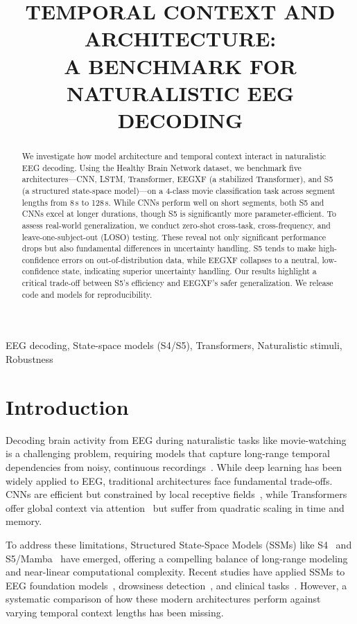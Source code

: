 \documentclass{article}
\title{TEMPORAL CONTEXT AND ARCHITECTURE:\\A BENCHMARK FOR NATURALISTIC EEG DECODING}
\newcommand{\eegtrans}{EEGXF}
\begin{document}
\maketitle

\begin{abstract}
We investigate how model architecture and temporal context interact in naturalistic EEG decoding. Using the Healthy Brain Network dataset, we benchmark five architectures—CNN, LSTM, Transformer, \eegtrans{} (a stabilized Transformer), and S5 (a structured state-space model)—on a 4-class movie classification task across segment lengths from 8\,s to 128\,s. While CNNs perform well on short segments, both S5 and CNNs excel at longer durations, though S5 is significantly more parameter-efficient. To assess real-world generalization, we conduct zero-shot cross-task, cross-frequency, and leave-one-subject-out (LOSO) testing. These reveal not only significant performance drops but also fundamental differences in uncertainty handling. S5 tends to make high-confidence errors on out-of-distribution data, while \eegtrans{} collapses to a neutral, low-confidence state, indicating superior uncertainty handling. Our results highlight a critical trade-off between S5's efficiency and \eegtrans's safer generalization. We release code and models for reproducibility.
\end{abstract}

\begin{keywords}
EEG decoding, State-space models (S4/S5), Transformers, Naturalistic stimuli, Robustness
\end{keywords}

\section{Introduction}
\label{sec:intro}

Decoding brain activity from EEG during naturalistic tasks like movie-watching is a challenging problem, requiring models that capture long-range temporal dependencies from noisy, continuous recordings~\cite{shirazi2024hbn}. While deep learning has been widely applied to EEG, traditional architectures face fundamental trade-offs. CNNs are efficient but constrained by local receptive fields~\cite{roy2019deep, schirrmeister2017deep}, while Transformers offer global context via attention~\cite{vaswani2017attention} but suffer from quadratic scaling in time and memory.

To address these limitations, Structured State-Space Models (SSMs) like S4~\cite{gu2022efficientlymodelinglongsequences} and S5/Mamba~\cite{gu2023mamba} have emerged, offering a compelling balance of long-range modeling and near-linear computational complexity. Recent studies have applied SSMs to EEG foundation models~\cite{wang2025eegmamba}, drowsiness detection~\cite{siddhad2024drowzee}, and clinical tasks~\cite{tran2024eegssm, li2025dgmamba}. However, a systematic comparison of how these modern architectures perform against varying temporal context lengths has been missing.
\end{document}
